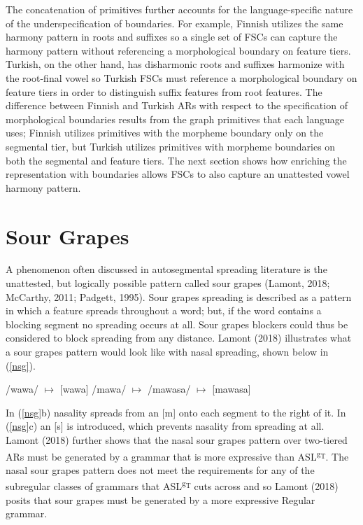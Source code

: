 \documentclass[,doc,floatsintext]{apa6}
\theoremstyle{definition}
\theoremstyle{definition}
\theoremstyle{definition}
\theoremstyle{remark}
\begin{document}
The concatenation of primitives further accounts for the
language-specific nature of the underspecification of boundaries. For
example, Finnish utilizes the same harmony pattern in roots and suffixes
so a single set of FSCs can capture the harmony pattern without
referencing a morphological boundary on feature tiers. Turkish, on the
other hand, has disharmonic roots and suffixes harmonize with the
root-final vowel so Turkish FSCs must reference a morphological boundary
on feature tiers in order to distinguish suffix features from root
features. The difference between Finnish and Turkish ARs with respect to
the specification of morphological boundaries results from the graph
primitives that each language uses; Finnish utilizes primitives with the
morpheme boundary only on the segmental tier, but Turkish utilizes
primitives with morpheme boundaries on both the segmental and feature
tiers. The next section shows how enriching the representation with
boundaries allows FSCs to also capture an unattested vowel harmony
pattern.

\section{Sour Grapes}\label{sour-grapes}

A phenomenon often discussed in autosegmental spreading literature is
the unattested, but logically possible pattern called sour grapes
(Lamont, 2018; McCarthy, 2011; Padgett, 1995). Sour grapes spreading is
described as a pattern in which a feature spreads throughout a word;
but, if the word contains a blocking segment no spreading occurs at all.
Sour grapes blockers could thus be considered to block spreading from
any distance. Lamont (2018) illustrates what a sour grapes pattern would
look like with nasal spreading, shown below in (\ref{nsg}).

\begin{exe}
\label{nsg}
\begin{xlist}
  \ex /wawa/ $\mapsto$ [wawa]
  \ex /mawa/ $\mapsto$ \textipa{[m\~a\~w\~a]}
  \ex /mawasa/ $\mapsto$ [mawasa]
\end{xlist}
\end{exe}

\noindent In (\ref{nsg}b) nasality spreads from an {[}m{]} onto each
segment to the right of it. In (\ref{nsg}c) an {[}s{]} is introduced,
which prevents nasality from spreading at all. Lamont (2018) further
shows that the nasal sour grapes pattern over two-tiered ARs must be
generated by a grammar that is more expressive than
ASL\textsuperscript{g\textsubscript{T}}. The nasal sour grapes pattern
does not meet the requirements for any of the subregular classes of
grammars that ASL\textsuperscript{g\textsubscript{T}} cuts across and so
Lamont (2018) posits that sour grapes must be generated by a more
expressive Regular grammar.
\end{document}
